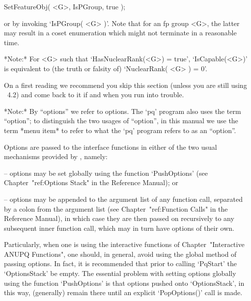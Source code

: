 SetFeatureObj( <G>, IsPGroup, true );

or by invoking `IsPGroup( <G> )'.  Note that for an fp group <G>, the
latter may result in a coset enumeration which might not
terminate in a reasonable time.

*Note:* For <G> such that `HasNuclearRank(<G>) = true',  `IsCapable(<G>)'
is equivalent to (the truth or falsity of) `NuclearRank( <G> ) = 0'.


On a first reading we recommend you skip this  section  (unless  you  are
still using {\GAP}~4.2) and come back to it if  and  when  you  run  into
trouble.

*Note:*
By ``options'' we refer to {\GAP} options. The `pq' program also uses the
term ``option''; to distinguish the two usages  of  ``option'',  in  this
manual we use the term *menu item* to refer  to  what  the  `pq'  program
refers to as an ``option''.

Options are passed to the {\ANUPQ} interface functions in either  of  the
two usual mechanisms provided by {\GAP}, namely:

\beginlist%

\item{--} options may be set globally using  the  function  `PushOptions'
(see Chapter~"ref:Options Stack" in the {\GAP} Reference Manual); or

\item{--} options may be appended to the argument list  of  any  function
call,   separated   by   a   colon   from   the   argument   list    (see
Chapter~"ref:Function Calls" in the {\GAP} Reference  Manual),  in  which
case they are then passed on recursively to any subsequent inner function
call, which may in turn have options of their own.

\endlist

Particularly,  when  one  is   using   the   interactive   functions   of
Chapter~"Interactive ANUPQ Functions",  one  should,  in  general,  avoid
using the global method of passing options. In fact,  it  is  recommended
that  prior  to  calling  `PqStart'  the  `OptionsStack'  be  empty.  The
essential problem  with  setting  options  globally  using  the  function
`PushOptions' is that options pushed onto `OptionsStack',  in  this  way,
(generally) remain there until an explicit `PopOptions()' call is made.


